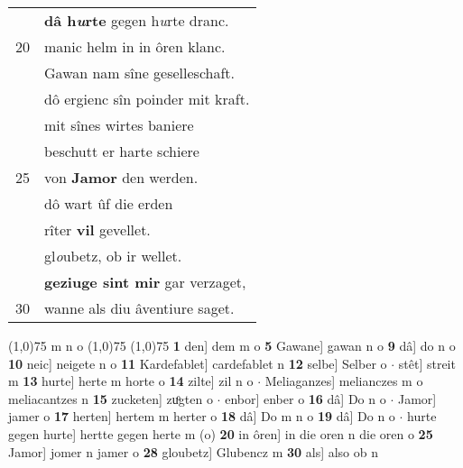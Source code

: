 \documentclass[8pt,a4paper,notitlepage]{article}
\begin{document}
\begin{table}[ht]
\begin{minipage}[t]{0.5\linewidth}
\begin{tabular}{rl}
 & \textbf{dâ h\textit{u}rte} gegen h\textit{u}rte dranc.\\ 
20 & manic helm in in ôren klanc.\\ 
 & Gawan nam sîne geselleschaft.\\ 
 & dô ergienc sîn poinder mit kraft.\\ 
 & mit sînes wirtes baniere\\ 
 & beschutt er harte schiere\\ 
25 & von \textbf{Jamor} den werden.\\ 
 & dô wart ûf die erden\\ 
 & rîter \textbf{vil} gevellet.\\ 
 & gl\textit{o}ubetz, ob ir wellet.\\ 
 & \textbf{geziuge sint mir} gar verzaget,\\ 
30 & wanne als diu âventiure saget.\\ 
\end{tabular}
\scriptsize
\line(1,0){75} \newline
m n o \newline
\line(1,0){75} \newline
\newline
\line(1,0){75} \newline
\textbf{1} den] dem m o \textbf{5} Gawane] gawan n o \textbf{9} dâ] do n o \textbf{10} neic] neigete n o \textbf{11} Kardefablet] cardefablet n \textbf{12} selbe] Selber o  $\cdot$ stêt] streit m \textbf{13} hurte] herte m horte o \textbf{14} zilte] zil n o  $\cdot$ Meliaganzes] melianczes m o meliacantzes n \textbf{15} zucketen] zuͦgten o  $\cdot$ enbor] enber o \textbf{16} dâ] Do n o  $\cdot$ Jamor] jamer o \textbf{17} herten] hertem m herter o \textbf{18} dâ] Do m n o \textbf{19} dâ] Do n o  $\cdot$ hurte gegen hurte] hertte gegen herte m (o) \textbf{20} in ôren] in die oren n die oren o \textbf{25} Jamor] jomer n jamer o \textbf{28} gloubetz] Glubencz m \textbf{30} als] also ob n \newline
\end{minipage}
\end{table}
\newpage
\end{document}
